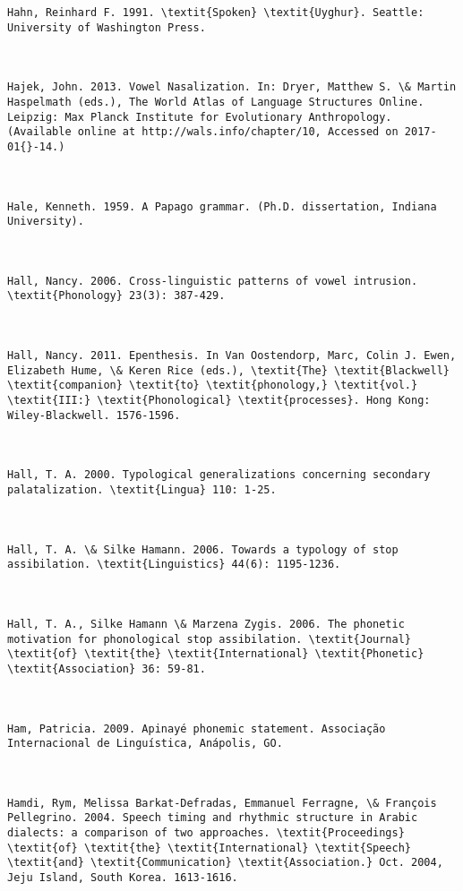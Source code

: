 \begin{verbatim}
Hahn, Reinhard F. 1991. \textit{Spoken} \textit{Uyghur}. Seattle: University of Washington Press.



Hajek, John. 2013. Vowel Nasalization. In: Dryer, Matthew S. \& Martin Haspelmath (eds.), The World Atlas of Language Structures Online. Leipzig: Max Planck Institute for Evolutionary Anthropology. (Available online at http://wals.info/chapter/10, Accessed on 2017-01{}-14.)



Hale, Kenneth. 1959. A Papago grammar. (Ph.D. dissertation, Indiana University).



Hall, Nancy. 2006. Cross-linguistic patterns of vowel intrusion. \textit{Phonology} 23(3): 387-429.



Hall, Nancy. 2011. Epenthesis. In Van Oostendorp, Marc, Colin J. Ewen, Elizabeth Hume, \& Keren Rice (eds.), \textit{The} \textit{Blackwell} \textit{companion} \textit{to} \textit{phonology,} \textit{vol.} \textit{III:} \textit{Phonological} \textit{processes}. Hong Kong: Wiley-Blackwell. 1576-1596.



Hall, T. A. 2000. Typological generalizations concerning secondary palatalization. \textit{Lingua} 110: 1-25.



Hall, T. A. \& Silke Hamann. 2006. Towards a typology of stop assibilation. \textit{Linguistics} 44(6): 1195-1236.



Hall, T. A., Silke Hamann \& Marzena Zygis. 2006. The phonetic motivation for phonological stop assibilation. \textit{Journal} \textit{of} \textit{the} \textit{International} \textit{Phonetic} \textit{Association} 36: 59-81.



Ham, Patricia. 2009. Apinayé phonemic statement. Associação Internacional de Linguística, Anápolis, GO.



Hamdi, Rym, Melissa Barkat-Defradas, Emmanuel Ferragne, \& François Pellegrino. 2004. Speech timing and rhythmic structure in Arabic dialects: a comparison of two approaches. \textit{Proceedings} \textit{of} \textit{the} \textit{International} \textit{Speech} \textit{and} \textit{Communication} \textit{Association.} Oct. 2004, Jeju Island, South Korea. 1613-1616.




\end{verbatim}
